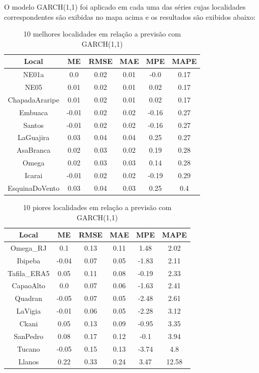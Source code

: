 \documentclass[
	12pt,				%
	openright,			%
	oneside,			%
	a4paper,			%
	english,			%
	french,				%
	spanish,			%
	brazil				%
	]{abntex2}
\begin{document}
O modelo GARCH(1,1) foi aplicado em cada uma das séries cujas localidades correspondentes são exibidas no mapa acima e os resultados são exibidos abaixo:

\begin{table}[h]
\centering
\begin{tabular}{ |c|c|c|c|c|c| } 
\hline
\textbf{Local}&\textbf{ME}&\textbf{RMSE}&\textbf{MAE}&\textbf{MPE}&\textbf{MAPE}\\
\hline
NE01a&0.0&0.02&0.01&-0.0&0.17\\
\hline
NE05&0.01&0.02&0.01&0.02&0.17\\
\hline
ChapadaAraripe&0.01&0.02&0.01&0.02&0.17\\
\hline
Embuaca&-0.01&0.02&0.02&-0.16&0.27\\
\hline
Santos&-0.01&0.02&0.02&-0.16&0.27\\
\hline
LaGuajira&0.03&0.04&0.04&0.25&0.27\\
\hline
AsaBranca&0.02&0.03&0.02&0.19&0.28\\
\hline
Omega&0.02&0.03&0.03&0.14&0.28\\
\hline
Icarai&-0.01&0.02&0.02&-0.19&0.29\\
\hline
EsquinaDoVento&0.03&0.04&0.03&0.25&0.4\\
\hline
\end{tabular}
\caption{10 melhores localidades em relação a previsão com GARCH(1,1)}
\end{table}

\begin{table}[h]
\centering
\begin{tabular}{ |c|c|c|c|c|c| } 
\hline
\textbf{Local}&\textbf{ME}&\textbf{RMSE}&\textbf{MAE}&\textbf{MPE}&\textbf{MAPE}\\
\hline
Omega\_RJ&0.1&0.13&0.11&1.48&2.02\\
\hline
Ibipeba&-0.04&0.07&0.05&-1.83&2.11\\
\hline
Tafila\_ERA5&0.05&0.11&0.08&-0.19&2.33\\
\hline
CapaoAlto&0.0&0.07&0.06&-1.63&2.41\\
\hline
Quadran&-0.05&0.07&0.05&-2.48&2.61\\
\hline
LaVigia&-0.01&0.06&0.05&-2.28&3.12\\
\hline
Ckani&0.05&0.13&0.09&-0.95&3.35\\
\hline
SanPedro&0.08&0.17&0.12&-0.1&3.94\\
\hline
Tucano&-0.05&0.15&0.13&-3.74&4.8\\
\hline
Llanos&0.22&0.33&0.24&3.47&12.58\\
\hline
\end{tabular}
\caption{10 piores localidades em relação a previsão com GARCH(1,1)}
\end{table}
\end{document}
